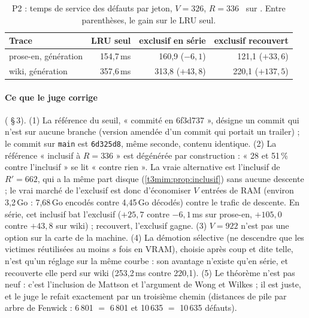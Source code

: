 \begin{table}[tbp]
\centering\small
\caption[P2 : temps de service des défauts par jeton]{P2 : temps de service des défauts par jeton, $V = 326$, $R = 336$ \calc~sur \mes. Entre parenthèses, le gain sur le LRU seul.}
\label{t3mim:tab:p2-temps}
\begin{tabular}{@{}lrrr@{}}
\toprule
Trace & LRU seul & exclusif en série & exclusif recouvert \\
\midrule
prose-en, génération & 154,7\,ms & 160,9 ($-6{,}1$) & 121,1 ($+33{,}6$) \\
wiki, génération & 357,6\,ms & 313,8 ($+43{,}8$) & 220,1 ($+137{,}5$) \\
\bottomrule
\end{tabular}
\end{table}

\paragraph{Ce que le juge corrige} ( §\,3). (1) La référence du seuil, « commité en 6f3d737 », désigne un commit qui n'est sur aucune branche (version amendée d'un commit qui portait un trailer) ; le commit sur \texttt{main} est \texttt{6d325d8}, même seconde, contenu identique. (2) La référence « inclusif à $R = 336$ » est dégénérée par construction : « 28 et 51\,\% contre l'inclusif » se lit « contre rien ». La vraie alternative est l'inclusif de $R' = 662$, qui a la même part disque (\cref{t3mim:prop:inclusif}) sans aucune descente ; le vrai marché de l'exclusif est donc d'économiser $V$ entrées de RAM (environ 3,2\,Go : 7,68\,Go encodés contre 4,45\,Go décodés) contre le trafic de descente. En série, cet inclusif bat l'exclusif ($+25{,}7$ contre $-6{,}1$\,ms sur prose-en, $+105{,}0$ contre $+43{,}8$ sur wiki) ; recouvert, l'exclusif gagne. (3) $V = 922$ n'est pas une option sur la carte de la machine. (4) La démotion sélective (ne descendre que les victimes réutilisées au moins $s$ fois en VRAM), choisie après coup et dite telle, n'est qu'un réglage sur la même courbe : son avantage n'existe qu'en série, et recouverte elle perd sur wiki (253,2\,ms contre 220,1). (5) Le théorème n'est pas neuf : c'est l'inclusion de Mattson et l'argument de Wong et Wilkes ; il est juste, et le juge le refait exactement par un troisième chemin (distances de pile par arbre de Fenwick : 6\,801 $=$ 6\,801 et 10\,635 $=$ 10\,635 défauts).


